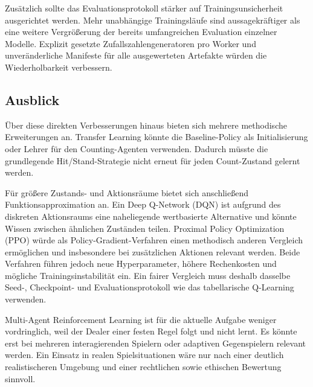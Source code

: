 Zusätzlich sollte das Evaluationsprotokoll stärker auf
Trainingsunsicherheit ausgerichtet werden. Mehr unabhängige
Trainingsläufe sind aussagekräftiger als eine weitere Vergrößerung
der bereits umfangreichen Evaluation einzelner Modelle. Explizit
gesetzte Zufallszahlengeneratoren pro Worker und unveränderliche
Manifeste für alle ausgewerteten Artefakte würden die
Wiederholbarkeit verbessern.

\subsection{Ausblick}

Über diese direkten Verbesserungen hinaus bieten sich mehrere
methodische Erweiterungen an. Transfer Learning könnte die
Baseline-Policy als Initialisierung oder Lehrer für den
Counting-Agenten verwenden. Dadurch müsste die grundlegende
Hit/Stand-Strategie nicht erneut für jeden Count-Zustand gelernt werden.

Für größere Zustands- und Aktionsräume bietet sich anschließend
Funktionsapproximation an. Ein Deep Q-Network (DQN) ist aufgrund des
diskreten Aktionsraums eine naheliegende wertbasierte Alternative und
könnte Wissen zwischen ähnlichen Zuständen teilen. Proximal Policy
Optimization (PPO) würde als Policy-Gradient-Verfahren einen
methodisch anderen Vergleich ermöglichen und insbesondere bei
zusätzlichen Aktionen relevant werden. Beide Verfahren führen jedoch
neue Hyperparameter, höhere Rechenkosten und mögliche
Trainingsinstabilität ein. Ein fairer Vergleich muss deshalb dasselbe
Seed-, Checkpoint- und Evaluationsprotokoll wie das tabellarische
Q-Learning verwenden.

Multi-Agent Reinforcement Learning ist für die aktuelle Aufgabe
weniger vordringlich, weil der Dealer einer festen Regel folgt und
nicht lernt. Es könnte erst bei mehreren interagierenden Spielern
oder adaptiven Gegenspielern relevant werden. Ein Einsatz in realen
Spielsituationen wäre nur nach einer deutlich realistischeren
Umgebung und einer rechtlichen sowie ethischen Bewertung sinnvoll.
